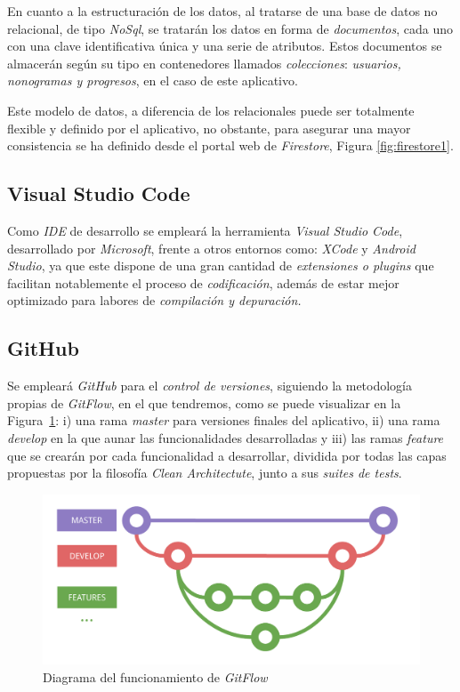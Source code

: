 En cuanto a la estructuración de los datos, al tratarse de una base de datos no relacional,
de tipo \textit{NoSql}, se tratarán los datos en forma de \textit{documentos}, cada uno con una clave identificativa única y una
serie de atributos. Estos documentos se almacerán según su tipo en contenedores llamados \textit{colecciones}:
\textit{usuarios, nonogramas y progresos}, en el caso de este aplicativo.

Este modelo de datos, a diferencia de los relacionales puede ser totalmente flexible y definido por el aplicativo, no obstante,
para asegurar una mayor consistencia se ha definido desde el portal web de \textit{Firestore}, Figura \ref{fig:firestore1}.

  \subsection{Visual Studio Code}
Como \textit{IDE} de desarrollo se empleará la herramienta \textit{Visual Studio Code}, desarrollado por
\textit{Microsoft}, frente a otros entornos como: \textit{XCode} y \textit{Android Studio}, ya que este dispone
de una gran cantidad de \textit{extensiones o plugins} que facilitan notablemente el proceso de \textit{codificación},
además de estar mejor optimizado para labores de \textit{compilación y depuración.}

\subsection{GitHub}
Se empleará \textit{GitHub} para el \textit{control de versiones}, siguiendo la metodología propias de 
\textit{GitFlow}, en el que tendremos, como se puede visualizar en la Figura~\ref{fig:gitflow1}:
i) una rama \textit{master} para versiones finales del aplicativo,
ii) una rama \textit{develop} en la que aunar las funcionalidades desarrolladas y iii) las ramas
\textit{feature} que se crearán por cada funcionalidad a desarrollar, dividida por todas las capas propuestas
por la filosofía \textit{Clean Architectute}, junto a sus \textit{suites de tests}.

\begin{figure}[H]
    \centering
    \includegraphics[scale=0.6]{images/gitflow1.pdf}
    \caption{Diagrama del funcionamiento de \textit{GitFlow}}
    \label{fig:gitflow1}
  \end{figure}

